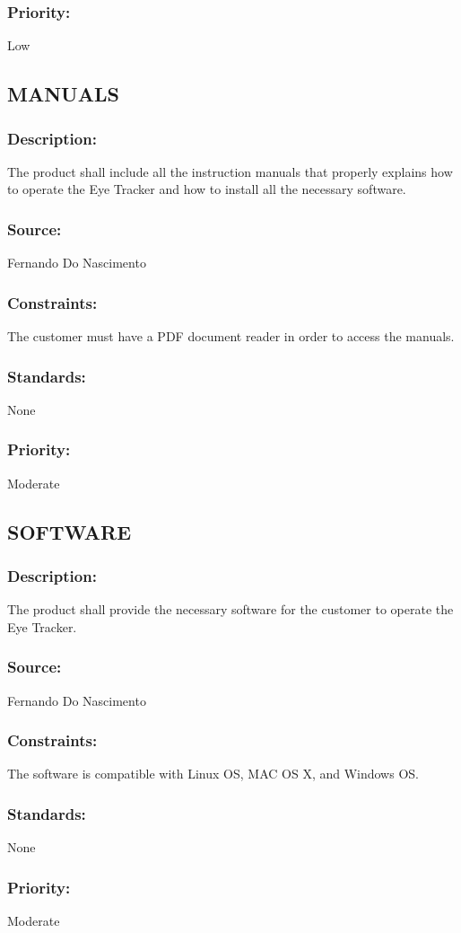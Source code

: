 \subsubsection{Priority:}
	{Low}
\newline
\newline

\subsection{\text MANUALS}
\subsubsection{Description:}
	{The product shall include all the instruction manuals that properly explains how to operate the Eye Tracker and how to install all the necessary software.}
\subsubsection{Source:} 
	{Fernando Do Nascimento}
\subsubsection{Constraints:} 
	{The customer must have a PDF document reader in order to access the manuals.}
\subsubsection{Standards:} 
	{None}
\subsubsection{Priority:} 
	{Moderate}
\newline
\newline
	
\subsection{\text SOFTWARE}
\subsubsection{Description:} 
	{The product shall provide the necessary software for the customer to operate the Eye Tracker.}
\subsubsection{Source:} 
	{Fernando Do Nascimento}
\subsubsection{Constraints:} 
	{The software is compatible with Linux OS, MAC OS X, and Windows OS.}
\subsubsection{Standards:} 
	{None}
\subsubsection{Priority:} 
	{Moderate}
